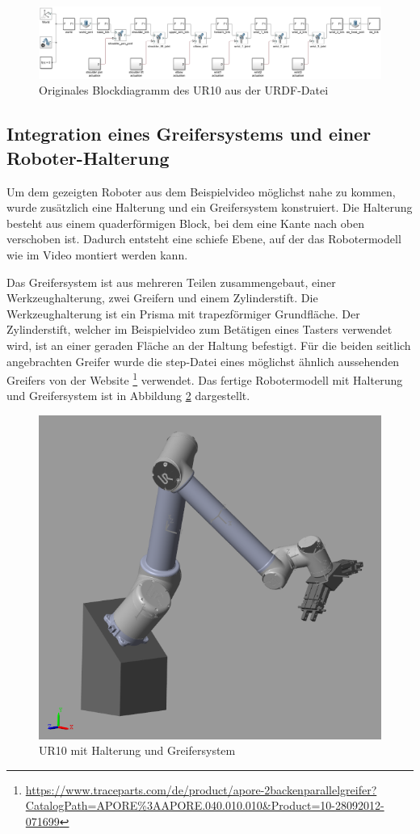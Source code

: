 \begin{figure}[!htbp]
	\centering
	\includegraphics[width=1.0\linewidth]{grafic/origin_UR10_modell}
	\caption{Originales Blockdiagramm des UR10 aus der URDF-Datei}
	\label{fig:ur10_origin_modell}
\end{figure}


\subsection{Integration eines Greifersystems und einer Roboter-Halterung}

Um dem gezeigten Roboter aus dem Beispielvideo möglichst nahe zu kommen, wurde zusätzlich eine Halterung und ein Greifersystem konstruiert.
Die Halterung besteht aus einem quaderförmigen Block, bei dem eine Kante nach oben verschoben ist. %
Dadurch entsteht eine schiefe Ebene, auf der das Robotermodell wie im Video montiert werden kann.

Das Greifersystem ist aus mehreren Teilen zusammengebaut, einer Werkzeughalterung, zwei Greifern und einem Zylinderstift.
Die Werkzeughalterung ist ein Prisma mit trapezförmiger Grundfläche.
Der Zylinderstift, welcher im Beispielvideo zum Betätigen eines Tasters verwendet wird, ist an einer geraden Fläche an der Haltung befestigt.
Für die beiden seitlich angebrachten Greifer wurde die step-Datei eines möglichst ähnlich aussehenden Greifers von der Website \footnote{\url{https://www.traceparts.com/de/product/apore-2backenparallelgreifer?CatalogPath=APORE\%3AAPORE.040.010.010&Product=10-28092012-071699}} verwendet.
Das fertige Robotermodell mit Halterung und Greifersystem ist in Abbildung \ref{fig:ur10_greifer} dargestellt.

\begin{figure}[!htbp]
	\centering
	\includegraphics[width=0.53\linewidth]{grafic/UR10_Greifer}
	\caption{UR10 mit Halterung und Greifersystem}
	\label{fig:ur10_greifer}
\end{figure}


